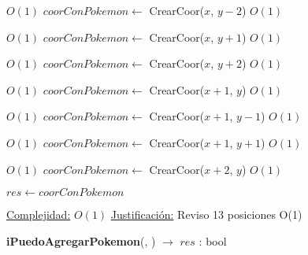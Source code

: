 \begin{Algoritmos}
\begin{algorithmic}[1]
             \Comment $O(1)$
            \State $coorConPokemon \gets$ CrearCoor($x$, $y-2$)    \Comment $O(1)$        
        \EndIf

    \EndIf

\EndIf


         \Comment $O(1)$
        \State $coorConPokemon \gets$ CrearCoor($x$, $y+1$)    \Comment $O(1)$    
    \EndIf


             \Comment $O(1)$
            \State $coorConPokemon \gets$ CrearCoor($x$, $y+2$)    \Comment $O(1)$
        \EndIf


    \EndIf

\EndIf

         \Comment $O(1)$
        \State $coorConPokemon \gets$ CrearCoor($x+1$, $y$)    \Comment $O(1)$
    \EndIf

             \Comment $O(1)$
            \State $coorConPokemon \gets$ CrearCoor($x+1$, $y-1$)    \Comment $O(1)$
        \EndIf
    \EndIf

             \Comment $O(1)$
            \State $coorConPokemon \gets$ CrearCoor($x+1$, $y+1$)    \Comment $O(1)$
        \EndIf

    \EndIf
\EndIf

         \Comment $O(1)$
        \State $coorConPokemon \gets$ CrearCoor($x+2$, $y$)    \Comment $O(1)$
    \EndIf
\EndIf

\State $res \gets coorConPokemon$

\medskip
\State \underline{Complejidad:} $O(1)$ %
\State \underline{Justificaci\'on:} Reviso 13 posiciones O(1)

\end{algorithmic}




\begin{algorithm}[H]
{\textbf{iPuedoAgregarPokemon}(, ) $\to$ $res$ : bool}
\begin{algorithmic}[1]


\end{algorithmic}
\end{algorithm}
\end{Algoritmos}
